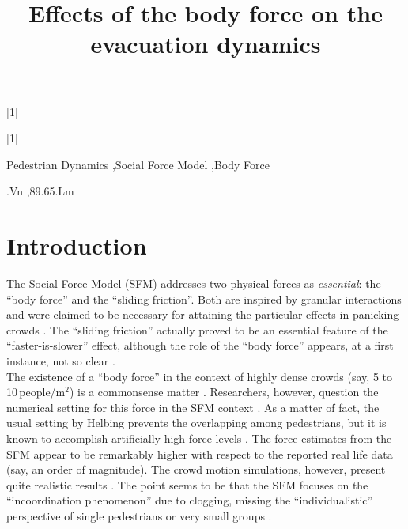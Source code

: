 \documentclass[preprint,12pt]{elsarticle}
\begin{document}
\newcommand*{\hwplotB}{\raisebox{3pt}{\tikz{\draw[red,dashed,line 
width=3.2pt](0,0) -- 
(5mm,0);}}}

\newrobustcmd*{\mydiamond}[1]{}

\newrobustcmd*{\mytriangleleft}[1]{}

\begin{frontmatter}


\title{Effects of the body force on the evacuation dynamics}


\begin{abstract}

\end{abstract}

\begin{keyword}

Pedestrian Dynamics \sep Social Force Model \sep Body Force


.Vn \sep 89.65.Lm

\end{keyword}

\end{frontmatter}


\section{\label{introduction}Introduction}

The Social Force Model (SFM) addresses two physical forces as 
\textit{essential}: the ``body force'' and the ``sliding friction''. Both are 
inspired by granular interactions and were claimed to be necessary  
for attaining the particular effects in panicking crowds \cite{helbing_2000}. 
The ``sliding friction'' actually proved to be an essential feature of the 
``faster-is-slower'' effect, although the role of the ``body force'' appears, 
at a first instance, not so clear \cite{dorso_2005,dorso_2007,dorso_2011}. \\ 

The existence of a ``body force'' in the context of highly dense crowds (say, 5 
to 10$\,$people/m$^2$) is a commonsense matter \cite{henein_2007,fruin_1993}. 
Researchers, however, question the numerical setting for this force in 
the SFM context \cite{lakoba_2005}. As a matter of fact, the usual setting by 
Helbing prevents the overlapping among pedestrians, but it is known to 
accomplish artificially high force levels 
\cite{helbing_2000,lakoba_2005,langston_2006,lin_2017}. The force estimates 
from the SFM appear to be remarkably higher with respect to the reported real 
life data (say, an order of magnitude). The crowd motion simulations, however, 
present quite realistic results \cite{lakoba_2005,langston_2006,dorso_2017}. 
The 
point seems to be that the SFM focuses on the ``incoordination phenomenon'' due 
to clogging, missing the ``individualistic'' perspective  of single pedestrians 
or very small groups \cite{helbing_2000,henein_2007,narain_2009}.  \\ 
\end{document}
